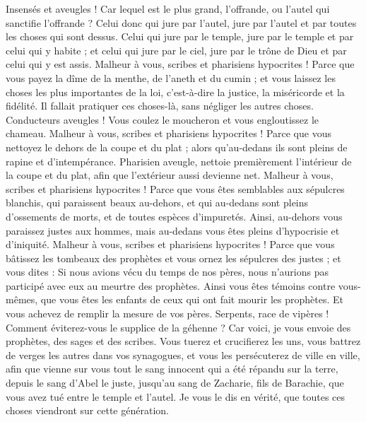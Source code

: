 \begin{multicols}{2}
Insensés et aveugles ! Car lequel est le plus grand, l'offrande, ou l'autel qui sanctifie l'offrande ?
Celui donc qui jure par l'autel, jure par l'autel et par toutes les choses qui sont dessus.
Celui qui jure par le temple, jure par le temple et par celui qui y habite ;
et celui qui jure par le ciel, jure par le trône de Dieu et par celui qui y est assis.
Malheur à vous, scribes et pharisiens hypocrites ! Parce que vous payez la dîme de la menthe, de l'aneth et du cumin ; et vous laissez les choses les plus importantes de la loi, c'est-à-dire la justice, la miséricorde et la fidélité. Il fallait pratiquer ces choses-là, sans négliger les autres choses.
Conducteurs aveugles ! Vous coulez le moucheron et vous engloutissez le chameau.
Malheur à vous, scribes et pharisiens hypocrites ! Parce que vous nettoyez le dehors de la coupe et du plat ; alors qu'au-dedans ils sont pleins de rapine et d'intempérance.
Pharisien aveugle, nettoie premièrement l'intérieur de la coupe et du plat, afin que l'extérieur aussi devienne net.
Malheur à vous, scribes et pharisiens hypocrites ! Parce que vous êtes semblables aux sépulcres blanchis, qui paraissent beaux au-dehors, et qui au-dedans sont pleins d'ossements de morts, et de toutes espèces d'impuretés.
Ainsi, au-dehors vous paraissez justes aux hommes, mais au-dedans vous êtes pleins d'hypocrisie et d'iniquité.
Malheur à vous, scribes et pharisiens hypocrites ! Parce que vous bâtissez les tombeaux des prophètes et vous ornez les sépulcres des justes ;
et vous dites : Si nous avions vécu du temps de nos pères, nous n'aurions pas participé avec eux au meurtre des prophètes.
Ainsi vous êtes témoins contre vous-mêmes, que vous êtes les enfants de ceux qui ont fait mourir les prophètes.
Et vous achevez de remplir la mesure de vos pères.
Serpents, race de vipères ! Comment éviterez-vous le supplice de la géhenne ?
Car voici, je vous envoie des prophètes, des sages et des scribes. Vous tuerez et crucifierez les uns, vous battrez de verges les autres dans vos synagogues, et vous les persécuterez de ville en ville,
afin que vienne sur vous tout le sang innocent qui a été répandu sur la terre, depuis le sang d'Abel le juste, jusqu'au sang de Zacharie, fils de Barachie, que vous avez tué entre le temple et l'autel.
Je vous le dis en vérité, que toutes ces choses viendront sur cette génération.

\end{multicols}

